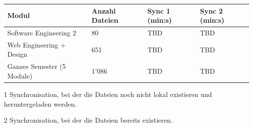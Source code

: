 \documentclass[a4paper]{article}
\begin{document}
  \begin{threeparttable}
    \begin{tabulary}{\linewidth}{Llll}
      \toprule
      Modul & Anzahl Dateien & Sync 1 (min:s)  & Sync 2 (min:s)  \\
      \midrule
      Software Engineering 2 & 80 & TBD & TBD \\
      Web Engineering + Design & 651 & TBD & TBD \\
      Ganzes Semester (5 Module) & 1'086 & TBD & TBD \\
      \bottomrule
    \end{tabulary}

    \begin{tablenotes}
      \item[1] Synchronisation, bei der die Dateien noch nicht lokal existieren und heruntergeladen werden.
      \item[2] Synchronisation, bei der die Dateien bereits existieren.
    \end{tablenotes}
  \end{threeparttable}
\end{document}
